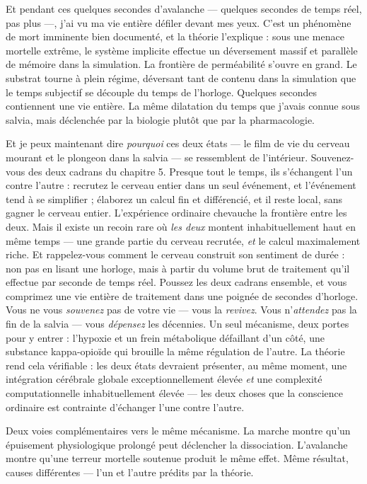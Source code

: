 \documentclass[11pt, twoside, openright]{book}
\begin{document}
Et pendant ces quelques secondes d'avalanche --- quelques secondes de temps réel, pas plus ---, j'ai vu ma vie entière défiler devant mes yeux. C'est un phénomène de mort imminente bien documenté, et la théorie l'explique : sous une menace mortelle extrême, le système implicite effectue un déversement massif et parallèle de mémoire dans la simulation. La frontière de perméabilité s'ouvre en grand. Le substrat tourne à plein régime, déversant tant de contenu dans la simulation que le temps subjectif se découple du temps de l'horloge. Quelques secondes contiennent une vie entière. La même dilatation du temps que j'avais connue sous salvia, mais déclenchée par la biologie plutôt que par la pharmacologie.

Et je peux maintenant dire \textit{pourquoi} ces deux états --- le film de vie du cerveau mourant et le plongeon dans la salvia --- se ressemblent de l'intérieur. Souvenez-vous des deux cadrans du chapitre 5. Presque tout le temps, ils s'échangent l'un contre l'autre : recrutez le cerveau entier dans un seul événement, et l'événement tend à se simplifier ; élaborez un calcul fin et différencié, et il reste local, sans gagner le cerveau entier. L'expérience ordinaire chevauche la frontière entre les deux. Mais il existe un recoin rare où \textit{les deux} montent inhabituellement haut en même temps --- une grande partie du cerveau recrutée, \textit{et} le calcul maximalement riche. Et rappelez-vous comment le cerveau construit son sentiment de durée : non pas en lisant une horloge, mais à partir du volume brut de traitement qu'il effectue par seconde de temps réel. Poussez les deux cadrans ensemble, et vous comprimez une vie entière de traitement dans une poignée de secondes d'horloge. Vous ne vous \textit{souvenez} pas de votre vie --- vous la \textit{revivez}. Vous n'\textit{attendez} pas la fin de la salvia --- vous \textit{dépensez} les décennies. Un seul mécanisme, deux portes pour y entrer : l'hypoxie et un frein métabolique défaillant d'un côté, une substance kappa-opioïde qui brouille la même régulation de l'autre. La théorie rend cela vérifiable : les deux états devraient présenter, au même moment, une intégration cérébrale globale exceptionnellement élevée \textit{et} une complexité computationnelle inhabituellement élevée --- les deux choses que la conscience ordinaire est contrainte d'échanger l'une contre l'autre.

Deux voies complémentaires vers le même mécanisme. La marche montre qu'un épuisement physiologique prolongé peut déclencher la dissociation. L'avalanche montre qu'une terreur mortelle soutenue produit le même effet. Même résultat, causes différentes --- l'un et l'autre prédits par la théorie.
\end{document}

